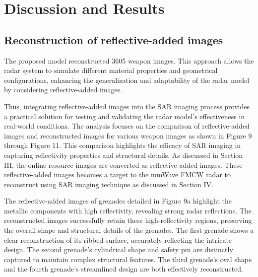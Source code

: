 \documentclass[journal,article,submit,pdftex,moreauthors]{Definitions/mdpi}
\begin{document}
\section{Discussion and Results}
\subsection{Reconstruction of reflective-added images}
The proposed model reconstructed 3605 weapon images. This approach allows the radar system to simulate different material properties and geometrical configurations, enhancing the generalization and adaptability of the radar model by considering reflective-added images. 

Thus, integrating reflective-added images into the SAR imaging process provides a practical solution for testing and validating the radar model's effectiveness in real-world conditions. The analysis focuses on the comparison of reflective-added images and reconstructed images for various weapon images as shown in Figure 9 through Figure 11. This comparison highlights the efficacy of SAR imaging in capturing reflectivity properties and structural details. As discussed in Section III, the online resource images are converted as reflective-added images. These reflective-added images becomes a target to the mmWave FMCW radar to reconstruct using SAR imaging technique as discussed in Section IV.


The reflective-added images of grenades detailed in Figure 9a highlight the metallic components with high reflectivity, revealing strong radar reflections. The reconstructed images successfully retain these high-reflectivity regions, preserving the overall shape and structural details of the grenades. The first grenade shows a clear reconstruction of its ribbed surface, accurately reflecting the intricate design. The second grenade's cylindrical shape and safety pin are distinctly captured to maintain complex structural features. The third grenade's oval shape and the fourth grenade's streamlined design are both effectively reconstructed.
\end{document}
